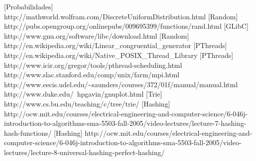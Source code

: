 \documentclass[a4paper]{article}
\begin{document}
\begin{thebibliography}{99}

[Probabilidades] http://mathworld.wolfram.com/DiscreteUniformDistribution.html
[Random] http://pubs.opengroup.org/onlinepubs/009695399/functions/rand.html
[GLibC] http://www.gnu.org/software/libc/download.html
[Random] http://en.wikipedia.org/wiki/Linear_congruential_generator
[PThreads] http://en.wikipedia.org/wiki/Native_POSIX_Thread_Library
[PThreads] http://www.icir.org/gregor/tools/pthread-scheduling.html
	 http://www.slac.stanford.edu/comp/unix/farm/mpi.html
	 http://www.eecis.udel.edu/\~{}saunders/courses/372/01f/manual/manual.html
	http://www.duke.edu/~hpgavin/gnuplot.html
[Trie] http://www.cs.bu.edu/teaching/c/tree/trie/
[Hashing]	http://ocw.mit.edu/courses/electrical-engineering-and-computer-science/6-046j-introduction-to-algorithms-sma-5503-fall-2005/video-lectures/lecture-7-hashing-hash-functions/
[Hashing]	http://ocw.mit.edu/courses/electrical-engineering-and-computer-science/6-046j-introduction-to-algorithms-sma-5503-fall-2005/video-lectures/lecture-8-universal-hashing-perfect-hashing/

	
\end{thebibliography}
\end{document}
